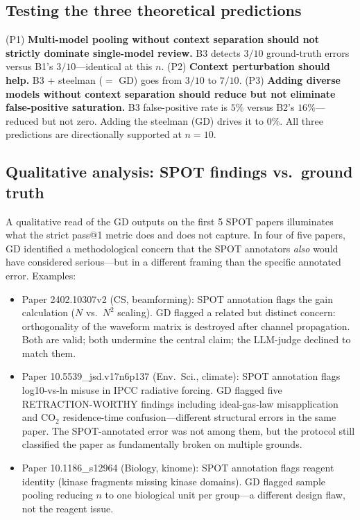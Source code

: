 \documentclass[11pt]{article}
\theoremstyle{definition}
\begin{document}
\subsection{Testing the three theoretical predictions}

(P1) \textbf{Multi-model pooling without context separation should not strictly dominate single-model review.} B3 detects $3/10$ ground-truth errors versus B1's $3/10$---identical at this $n$. (P2) \textbf{Context perturbation should help.} B3 + steelman ($=$ GD) goes from $3/10$ to $7/10$. (P3) \textbf{Adding diverse models without context separation should reduce but not eliminate false-positive saturation.} B3 false-positive rate is $5\%$ versus B2's $16\%$---reduced but not zero. Adding the steelman (GD) drives it to $0\%$. All three predictions are directionally supported at $n = 10$.

\subsection{Qualitative analysis: SPOT findings vs.\ ground truth}

A qualitative read of the GD outputs on the first 5 SPOT papers illuminates what the strict pass@1 metric does and does not capture. In four of five papers, GD identified a methodological concern that the SPOT annotators \emph{also} would have considered serious---but in a different framing than the specific annotated error. Examples:

\begin{itemize}
\item Paper 2402.10307v2 (CS, beamforming): SPOT annotation flags the gain calculation ($N$ vs.\ $N^2$ scaling). GD flagged a related but distinct concern: orthogonality of the waveform matrix is destroyed after channel propagation. Both are valid; both undermine the central claim; the LLM-judge declined to match them.

\item Paper 10.5539\_jsd.v17n6p137 (Env.~Sci., climate): SPOT annotation flags log10-vs-ln misuse in IPCC radiative forcing. GD flagged five RETRACTION-WORTHY findings including ideal-gas-law misapplication and CO$_2$ residence-time confusion---different structural errors in the same paper. The SPOT-annotated error was not among them, but the protocol still classified the paper as fundamentally broken on multiple grounds.

\item Paper 10.1186\_s12964 (Biology, kinome): SPOT annotation flags reagent identity (kinase fragments missing kinase domains). GD flagged sample pooling reducing $n$ to one biological unit per group---a different design flaw, not the reagent issue.
\end{itemize}
\end{document}
